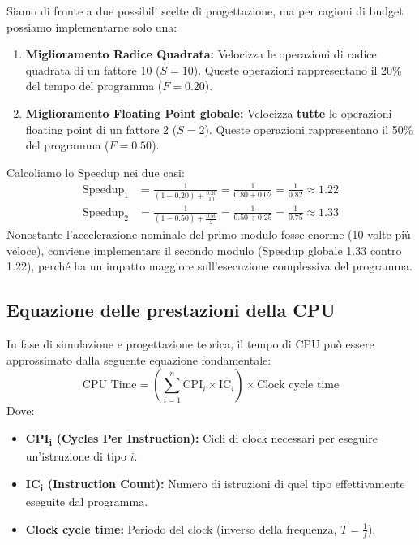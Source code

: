 \begin{example}
Siamo di fronte a due possibili scelte di progettazione, ma per ragioni di budget possiamo implementarne solo una:
\begin{enumerate}
    \item \textbf{Miglioramento Radice Quadrata:} Velocizza le operazioni di radice quadrata di un fattore 10 (\( S = 10 \)). Queste operazioni rappresentano il 20\% del tempo del programma (\( F = 0.20 \)).
    \item \textbf{Miglioramento Floating Point globale:} Velocizza \textbf{tutte} le operazioni floating point di un fattore 2 (\( S = 2 \)). Queste operazioni rappresentano il 50\% del programma (\( F = 0.50 \)).
\end{enumerate}

Calcoliamo lo Speedup nei due casi:
\begin{align*}
\text{Speedup}_1 &= \frac{1}{(1 - 0.20) + \frac{0.20}{10}} = \frac{1}{0.80 + 0.02} = \frac{1}{0.82} \approx 1.22 \\
\text{Speedup}_2 &= \frac{1}{(1 - 0.50) + \frac{0.50}{2}} = \frac{1}{0.50 + 0.25} = \frac{1}{0.75} \approx 1.33
\end{align*}
Nonostante l'accelerazione nominale del primo modulo fosse enorme (10 volte più veloce), conviene implementare il secondo modulo (Speedup globale 1.33 contro 1.22), perché ha un impatto maggiore sull'esecuzione complessiva del programma.
\end{example}

\subsection{Equazione delle prestazioni della CPU}
In fase di simulazione e progettazione teorica, il tempo di CPU può essere approssimato dalla seguente equazione fondamentale:
\begin{equation}
\text{CPU Time} = \left( \sum_{i=1}^{n} \text{CPI}_i \times \text{IC}_i \right) \times \text{Clock cycle time}
\end{equation}
Dove:
\begin{itemize}
    \item \textbf{CPI\textsubscript{i} (Cycles Per Instruction):} Cicli di clock necessari per eseguire un'istruzione di tipo \( i \).
    \item \textbf{IC\textsubscript{i} (Instruction Count):} Numero di istruzioni di quel tipo effettivamente eseguite dal programma.
    \item \textbf{Clock cycle time:} Periodo del clock (inverso della frequenza, $T = \frac{1}{f}$).
\end{itemize}

